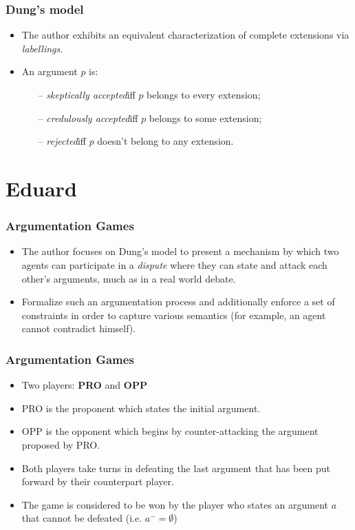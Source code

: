 \documentclass{beamer}
\begin{document}
\begin{frame}
\frametitle{Dung's model}
\begin{itemize}
\item The author exhibits an equivalent characterization of complete extensions via \emph{labellings}. \pause
\item An argument $p$ is:
  \begin{itemize}
  \item[--] \emph{skeptically accepted}\quad iff $p$ belongs to every extension;
  \item[--] \emph{credulously accepted}\quad iff $p$ belongs to some extension;
  \item[--] \emph{rejected}\quad iff $p$ doesn't belong to any extension.
  \end{itemize}
\end{itemize}
\end{frame}

\section{Eduard}
\begin{frame}
	\frametitle{Argumentation Games}
	\begin{itemize}
		\item The author focuses on Dung's model to present a mechanism by which two agents can participate in a \emph{dispute} where they can state and attack each other's arguments, much as in a real world debate. \pause

		\item Formalize such an argumentation process and additionally enforce a set of constraints in order to capture various semantics (for example, an agent cannot contradict himself).
	\end{itemize}
\end{frame}

\begin{frame}
	\frametitle{Argumentation Games}
	\begin{itemize}
		\item Two players: \textbf{PRO} and \textbf{OPP} \pause

		\item PRO is the proponent which states the initial argument. \pause
		\item OPP is the opponent which begins by counter-attacking the argument proposed by PRO.\pause
		\item Both players take turns in defeating the last argument that has been put forward by their counterpart player.\pause
		\item The game is considered to be won by the player who states an argument $a$ that cannot be defeated (i.e. $a^{-} = \emptyset$)
	\end{itemize}
\end{frame}
\end{document}
